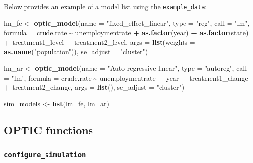 \documentclass[
]{article}
\newenvironment{Shaded}{\begin{snugshade}}{\end{snugshade}}
\newcommand{\DataTypeTok}[1]{\textcolor[rgb]{0.13,0.29,0.53}{#1}}
\newcommand{\KeywordTok}[1]{\textcolor[rgb]{0.13,0.29,0.53}{\textbf{#1}}}
\newcommand{\NormalTok}[1]{#1}
\newcommand{\OperatorTok}[1]{\textcolor[rgb]{0.81,0.36,0.00}{\textbf{#1}}}
\newcommand{\StringTok}[1]{\textcolor[rgb]{0.31,0.60,0.02}{#1}}
\begin{document}
Below provides an example of a model list using the
\texttt{example\_data}:

\begin{Shaded}
\begin{Highlighting}[]
\NormalTok{lm\_fe \textless{}{-}}\StringTok{ }\KeywordTok{optic\_model}\NormalTok{(}\DataTypeTok{name =} \StringTok{"fixed\_effect\_linear"}\NormalTok{, }\DataTypeTok{type =} \StringTok{"reg"}\NormalTok{,}
    \DataTypeTok{call =} \StringTok{"lm"}\NormalTok{, }\DataTypeTok{formula =}\NormalTok{ crude.rate }\OperatorTok{\textasciitilde{}}\StringTok{ }\NormalTok{unemploymentrate }\OperatorTok{+}\StringTok{ }\KeywordTok{as.factor}\NormalTok{(year) }\OperatorTok{+}
\StringTok{        }\KeywordTok{as.factor}\NormalTok{(state) }\OperatorTok{+}\StringTok{ }\NormalTok{treatment1\_level }\OperatorTok{+}\StringTok{ }\NormalTok{treatment2\_level,}
    \DataTypeTok{args =} \KeywordTok{list}\NormalTok{(}\DataTypeTok{weights =} \KeywordTok{as.name}\NormalTok{(}\StringTok{"population"}\NormalTok{)), }\DataTypeTok{se\_adjust =} \StringTok{"cluster"}\NormalTok{)}

\NormalTok{lm\_ar \textless{}{-}}\StringTok{ }\KeywordTok{optic\_model}\NormalTok{(}\DataTypeTok{name =} \StringTok{"Auto{-}regressive linear"}\NormalTok{, }\DataTypeTok{type =} \StringTok{"autoreg"}\NormalTok{,}
    \DataTypeTok{call =} \StringTok{"lm"}\NormalTok{, }\DataTypeTok{formula =}\NormalTok{ crude.rate }\OperatorTok{\textasciitilde{}}\StringTok{ }\NormalTok{unemploymentrate }\OperatorTok{+}\StringTok{ }\NormalTok{year }\OperatorTok{+}
\StringTok{        }\NormalTok{treatment1\_change }\OperatorTok{+}\StringTok{ }\NormalTok{treatment2\_change, }\DataTypeTok{args =} \KeywordTok{list}\NormalTok{(),}
    \DataTypeTok{se\_adjust =} \StringTok{"cluster"}\NormalTok{)}

\NormalTok{sim\_models \textless{}{-}}\StringTok{ }\KeywordTok{list}\NormalTok{(lm\_fe, lm\_ar)}
\end{Highlighting}
\end{Shaded}

\hypertarget{optic-functions}{%
\subsection{OPTIC functions}\label{optic-functions}}

\hypertarget{configure_simulation}{%
\subsubsection{\texorpdfstring{\texttt{configure\_simulation}}{configure\_simulation}}\label{configure_simulation}}
\end{document}
